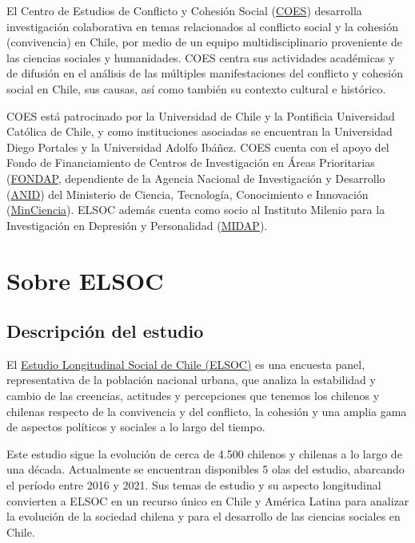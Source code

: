 \documentclass[
  12pt,
]{book}
\begin{document}
El Centro de Estudios de Conflicto y Cohesión Social (\href{https://coes.cl/}{COES}) desarrolla investigación colaborativa en temas relacionados al conflicto social y la cohesión (convivencia) en Chile, por medio de un equipo multidisciplinario proveniente de las ciencias sociales y humanidades. COES centra sus actividades académicas y de difusión en el análisis de las múltiples manifestaciones del conflicto y cohesión social en Chile, sus causas, así como también su contexto cultural e histórico.

COES está patrocinado por la Universidad de Chile y la Pontificia Universidad Católica de Chile, y como instituciones asociadas se encuentran la Universidad Diego Portales y la Universidad Adolfo Ibáñez. COES cuenta con el apoyo del Fondo de Financiamiento de Centros de Investigación en Áreas Prioritarias (\href{https://www.conicyt.cl/fondap/sobre-fondap/que-es-fondap/}{FONDAP}, dependiente de la Agencia Nacional de Investigación y Desarrollo (\href{https://www.anid.cl/}{ANID}) del Ministerio de Ciencia, Tecnología, Conocimiento e Innovación (\href{https://www.minciencia.gob.cl/}{MinCiencia}). ELSOC además cuenta como socio al Instituto Milenio para la Investigación en Depresión y Personalidad (\href{https://midap.org/}{MIDAP}).

\hypertarget{sobre-elsoc}{%
\section*{Sobre ELSOC}\label{sobre-elsoc}}

\hypertarget{descripciuxf3n-del-estudio}{%
\subsection*{Descripción del estudio}\label{descripciuxf3n-del-estudio}}

El \href{https://coes.cl/encuesta-panel/}{Estudio Longitudinal Social de Chile (ELSOC)} es una encuesta panel, representativa de la población nacional urbana, que analiza la estabilidad y cambio de las creencias, actitudes y percepciones que tenemos los chilenos y chilenas respecto de la convivencia y del conflicto, la cohesión y una amplia gama de aspectos políticos y sociales a lo largo del tiempo.

Este estudio sigue la evolución de cerca de 4.500 chilenos y chilenas a lo largo de una década. Actualmente se encuentran disponibles 5 olas del estudio, abarcando el período entre 2016 y 2021. Sus temas de estudio y su aspecto longitudinal convierten a ELSOC en un recurso único en Chile y América Latina para analizar la evolución de la sociedad chilena y para el desarrollo de las ciencias sociales en Chile.
\end{document}
